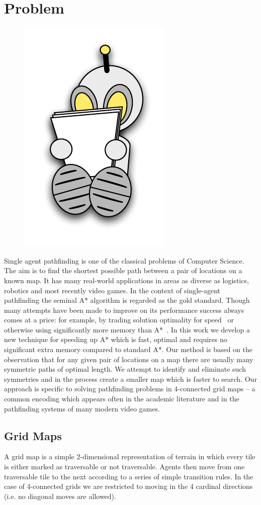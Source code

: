 \section{Problem}
 \begin{figure}
\vspace{-2.5em}
		\includegraphics[width=0.12\columnwidth, trim=10mm 10mm 10mm 10mm]{diagrams/robot_reading.pdf}
\vspace{-2em}
 \end{figure}
Single agent pathfinding is one of the classical problems of Computer Science.
The aim is to find the shortest possible path between a pair of locations 
on a known map. 
It has many real-world applications in areas as diverse as logistics, 
robotics and most recently video games.
\newline \newline
In the context of single-agent pathfinding the seminal A* algorithm 
\cite{hart68} is regarded as the gold standard. 
Though many attempts have been made to improve on its performance success always 
comes at a price: for example, by trading solution
optimality for speed~\cite{botea04} or otherwise using significantly more memory than A*~\cite{sturtevant09}.
In this work we develop a new technique for speeding up A* which is fast,
optimal and requires no significant extra memory compared to standard
A*.
Our method is based on the observation that for any given pair of locations on a
map there are usually many symmetric paths of optimal length. 
We attempt to identify and eliminate such symmetries and in the process create
a smaller map which is faster to search.
Our approach is specific to solving pathfinding problems in 4-connected grid
maps -- a common encoding which appears often in the academic literature and in
the pathfinding systems of many modern video games.

\subsection{Grid Maps}
A grid map is a simple 2-dimensional representation of terrain in which every
tile is either marked as traversable or not traversable.
Agents then move from one traversable tile to the next according to a series of 
simple transition rules.
In the case of 4-connected grids we are restricted to moving in the 4 cardinal
directions (i.e. no diagonal moves are allowed).

